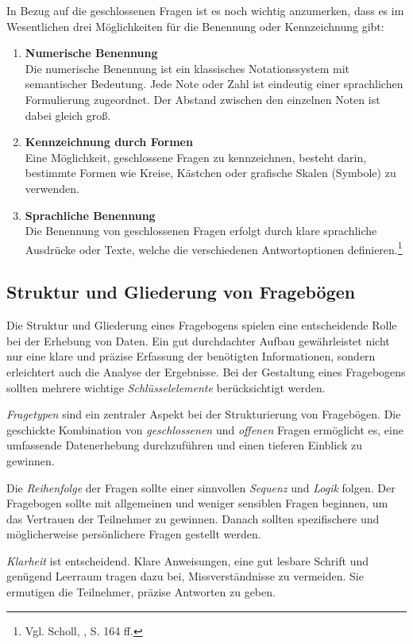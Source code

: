 In Bezug auf die geschlossenen Fragen ist es noch wichtig anzumerken, dass es im Wesentlichen drei Möglichkeiten für die
Benennung oder Kennzeichnung gibt:
\begin{enumerate}
    \item \textbf{Numerische Benennung}\\
    Die numerische Benennung ist ein klassisches Notationssystem mit semantischer Bedeutung. Jede Note oder Zahl ist
    eindeutig einer sprachlichen Formulierung zugeordnet. Der Abstand zwischen den einzelnen Noten ist dabei gleich groß.
    \item \textbf{Kennzeichnung durch Formen}\\
    Eine Möglichkeit, geschlossene Fragen zu kennzeichnen, besteht darin, bestimmte Formen wie Kreise, Kästchen oder
    grafische Skalen (Symbole) zu verwenden.
    \item \textbf{Sprachliche Benennung}\\
    Die Benennung von geschlossenen Fragen erfolgt durch klare sprachliche Ausdrücke oder Texte, welche die verschiedenen
    Antwortoptionen definieren.\footnote{Vgl. Scholl, \cite{Die Befragung}, S. 164 ff.}
\end{enumerate}

\subsection{Struktur und Gliederung von Fragebögen}
Die Struktur und Gliederung eines Fragebogens spielen eine entscheidende Rolle bei der Erhebung von Daten. Ein gut
durchdachter Aufbau gewährleistet nicht nur eine klare und präzise Erfassung der benötigten Informationen, sondern
erleichtert auch die Analyse der Ergebnisse. Bei der Gestaltung eines Fragebogens sollten mehrere wichtige \textit{Schlüsselelemente}
berücksichtigt werden.

\textit{Fragetypen} sind ein zentraler Aspekt bei der Strukturierung von Fragebögen. Die geschickte Kombination von
\textit{geschlossenen} und \textit{offenen} Fragen ermöglicht es, eine umfassende Datenerhebung durchzuführen und einen
tieferen Einblick zu gewinnen.

Die \textit{Reihenfolge} der Fragen sollte einer sinnvollen \textit{Sequenz} und \textit{Logik} folgen. Der Fragebogen
sollte mit allgemeinen und weniger sensiblen Fragen beginnen, um das Vertrauen der Teilnehmer zu gewinnen. Danach sollten
spezifischere und möglicherweise persönlichere Fragen gestellt werden.

\textit{Klarheit} ist entscheidend. Klare Anweisungen, eine gut lesbare Schrift und genügend Leerraum tragen dazu bei,
Missverständnisse zu vermeiden. Sie ermutigen die Teilnehmer, präzise Antworten zu geben.

